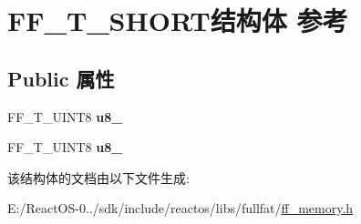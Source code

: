\hypertarget{struct_f_f___t___s_h_o_r_t}{}\section{F\+F\+\_\+\+T\+\_\+\+S\+H\+O\+R\+T结构体 参考}
\label{struct_f_f___t___s_h_o_r_t}
\subsection*{Public 属性}
\begin{DoxyCompactItemize}
\item 
\mbox{\label{struct_f_f___t___s_h_o_r_t_a83e500e7e47b577cbf4aeec8d8984033}} 
F\+F\+\_\+\+T\+\_\+\+U\+I\+N\+T8 {\bfseries u8\+\_}
\item 
\mbox{\label{struct_f_f___t___s_h_o_r_t_a78bbf6979c4e58a11826068948f3f95c}} 
F\+F\+\_\+\+T\+\_\+\+U\+I\+N\+T8 {\bfseries u8\+\_}
\end{DoxyCompactItemize}


该结构体的文档由以下文件生成\+:\begin{DoxyCompactItemize}
\item 
E\+:/\+React\+O\+S-\/0../sdk/include/reactos/libs/fullfat/\hyperlink{ff__memory_8h}{ff\+\_\+memory.\+h}\end{DoxyCompactItemize}
